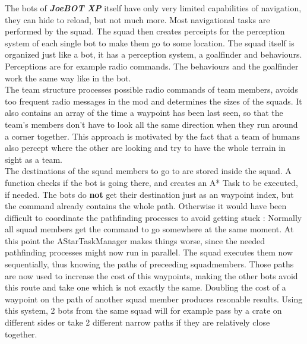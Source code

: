 \documentclass[12pt]{article}
\newcommand {\joebotxp}{\textit{\textbf{JoeBOT XP}} }
\begin{document}
The bots of \joebotxp itself have only very limited capabilities of navigation, they can hide to reload, but not much more. Most navigational tasks are performed by the squad. The squad then creates perceipts for the perception system of each single bot to make them go to some location. The squad itself is organized just like a bot, it has a perception system, a goalfinder and behaviours. Perceptions are for example radio commands. The behaviours and the goalfinder work the same way like in the bot.\\
The team structure processes possible radio commands of team members, avoids too frequent radio messages in the mod and determines the sizes of the squads. It also contains an array of the time a waypoint has been last seen, so that the team's members don't have to look all the same direction when they run around a corner together. This approach is motivated by the fact that a team of humans also percept where the other are looking and try to have the whole terrain in sight as a team.\\
The destinations of the squad members to go to are stored inside the squad. A function checks if the bot is going there, and creates an A* Task to be executed, if needed. The bots do \textbf{not} get their destination just as an waypoint index, but the command already contains the whole path. Otherwise it would have been difficult to coordinate the pathfinding processes to avoid getting stuck : Normally all squad members get the command to go somewhere at the same moment. At this point the AStarTaskManager makes things worse, since the needed pathfinding processes might now run in parallel. The squad executes them now sequentially, thus knowing the paths of preceeding squadmembers. Those paths are now used to increase the cost of this waypoints, making the other bots avoid this route and take one which is not exactly the same. Doubling the cost of a waypoint on the path of another squad member produces resonable results. Using this system, 2 bots from the same squad will for example pass by a crate on different sides or take 2 different narrow paths if they are relatively close together.
\end{document}

